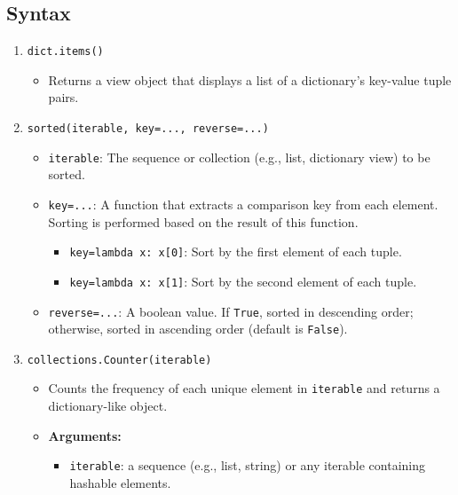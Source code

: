 \subsection{Syntax}
\begin{summary}

    \begin{enumerate}
        \item \texttt{dict.items()}
        \begin{itemize}
            \item Returns a view object that displays a list of a dictionary's key-value tuple pairs.
        \end{itemize}
        \item \texttt{sorted(iterable,\ key=...,\ reverse=...)}
        \begin{itemize}
            \item \texttt{iterable}: The sequence or collection (e.g., list, dictionary view) to be sorted.
            \item \texttt{key=...}: A function that extracts a comparison key from each element. Sorting is performed based on the result of this function.
            \begin{itemize}
                \item \texttt{key=lambda x: x[0]}: Sort by the first element of each tuple.
                \item \texttt{key=lambda x: x[1]}: Sort by the second element of each tuple.
            \end{itemize}
            \item \texttt{reverse=...}: A boolean value. If \texttt{True}, sorted in descending order; otherwise, sorted in ascending order (default is \texttt{False}).
        \end{itemize}
        \item \texttt{collections.Counter(iterable)}
        \begin{itemize}
            \item Counts the frequency of each unique element in \texttt{iterable} and returns a dictionary-like object.
            \item \textbf{Arguments:}
            \begin{itemize}
                \item \texttt{iterable}: a sequence (e.g., list, string) or any iterable containing hashable elements.
            \end{itemize}
        \end{itemize}
    \end{enumerate}

\end{summary}
